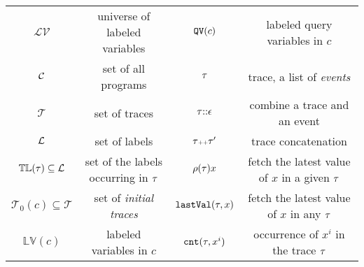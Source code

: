     \begin{table}
      \caption{}
      \label{tb:notation}
      \begin{center}
        \begin{tabular}{| c |c |c| c| }
          \hline 
          $\mathcal{LV}$   & universe of labeled variables  & $\mathtt{QV}(c)$ & labeled query variables in $c$\\ 
          $\mathcal{C}$  & set of all programs &  $\mathtt{\tau}$ &   trace, a list of \emph{events}\\  
          $\mathcal{T}$  &  set of traces &  $\mathtt{\tau} {\small ::} \mathtt{\epsilon}$  & combine a trace and an event  \\
          $\mathcal{L}$ & set of labels  & $\mathtt{\tau} {\scriptscriptstyle ++} \mathtt{\tau}'$ &  trace concatenation \\
          $\mathbb{TL}(\mathtt{\tau}) \subseteq \mathcal{L}$  &set of the labels occurring in $\mathtt{\tau}$  &  $ \rho (\mathtt{\tau}) x$  & fetch the latest value of  $x$ in a given $\mathtt{\tau}$ \\
          $\mathcal{T}_0(c) \subseteq \mathcal{T}$ &  set of \emph{initial traces} & $\mathtt{lastVal} (\mathtt{\tau}, x)$  & fetch the latest value of  $x$ in any $\mathtt{\tau}$\\
          $\mathbb{LV}(c)$  & labeled variables in $c$ & $\mathtt{cnt}(\mathtt{\tau}, x^i)$ & occurrence of $x^i$ in the trace $\mathtt{\tau}$\\
          \hline 
        \end{tabular}
        \end{center}
      \end{table}
